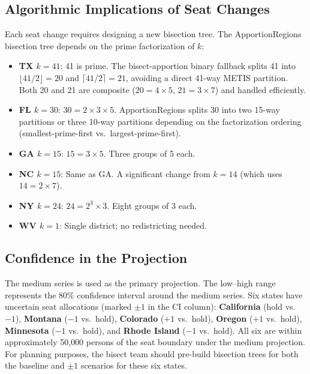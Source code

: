 \subsection{Algorithmic Implications of Seat Changes}

Each seat change requires designing a new bisection tree.
The ApportionRegions bisection tree depends on the prime factorization of $k$:

\begin{itemize}
  \item \textbf{TX $k = 41$}: 41 is prime. The bisect-apportion binary fallback
    splits 41 into $\lfloor 41/2 \rfloor = 20$ and $\lceil 41/2 \rceil = 21$,
    avoiding a direct 41-way METIS partition. Both 20 and 21 are composite
    ($20 = 4\times5$, $21 = 3\times7$) and handled efficiently.
  \item \textbf{FL $k = 30$}: $30 = 2\times3\times5$. ApportionRegions splits
    30 into two 15-way partitions or three 10-way partitions depending on the
    factorization ordering (smallest-prime-first vs.\ largest-prime-first).
  \item \textbf{GA $k = 15$}: $15 = 3\times5$. Three groups of 5 each.
  \item \textbf{NC $k = 15$}: Same as GA. A significant change from $k=14$
    (which uses $14 = 2\times7$).
  \item \textbf{NY $k = 24$}: $24 = 2^3\times3$. Eight groups of 3 each.
  \item \textbf{WV $k = 1$}: Single district; no redistricting needed.
\end{itemize}

\subsection{Confidence in the Projection}

The medium series is used as the primary projection. The low--high range
represents the 80\% confidence interval around the medium series.
Six states have uncertain seat allocations (marked $\pm1$ in the CI column):
\textbf{California} (hold vs.\ $-1$), \textbf{Montana} ($-1$ vs.\ hold),
\textbf{Colorado} ($+1$ vs.\ hold), \textbf{Oregon} ($+1$ vs.\ hold),
\textbf{Minnesota} ($-1$ vs.\ hold), and \textbf{Rhode Island} ($-1$ vs.\ hold).
All six are within approximately 50{,}000 persons of the seat boundary under
the medium projection.
For planning purposes, the bisect team should pre-build bisection trees for
both the baseline and $\pm1$ scenarios for these six states.
